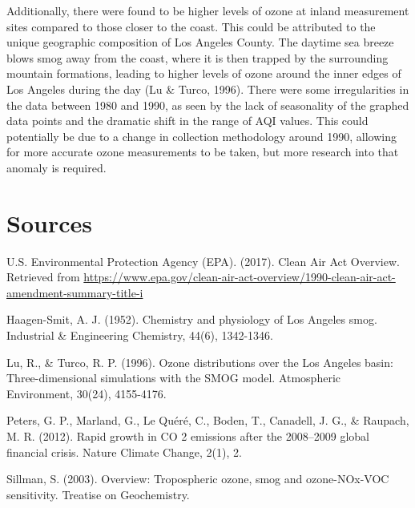 \documentclass[12pt,]{article}
\begin{document}
Additionally, there were found to be higher levels of ozone at inland
measurement sites compared to those closer to the coast. This could be
attributed to the unique geographic composition of Los Angeles County.
The daytime sea breeze blows smog away from the coast, where it is then
trapped by the surrounding mountain formations, leading to higher levels
of ozone around the inner edges of Los Angeles during the day (Lu \&
Turco, 1996). There were some irregularities in the data between 1980
and 1990, as seen by the lack of seasonality of the graphed data points
and the dramatic shift in the range of AQI values. This could
potentially be due to a change in collection methodology around 1990,
allowing for more accurate ozone measurements to be taken, but more
research into that anomaly is required.

\newpage

\section{Sources}\label{sources}

U.S. Environmental Protection Agency (EPA). (2017). Clean Air Act
Overview. Retrieved from
\url{https://www.epa.gov/clean-air-act-overview/1990-clean-air-act-amendment-summary-title-i}

Haagen-Smit, A. J. (1952). Chemistry and physiology of Los Angeles smog.
Industrial \& Engineering Chemistry, 44(6), 1342-1346.

Lu, R., \& Turco, R. P. (1996). Ozone distributions over the Los Angeles
basin: Three-dimensional simulations with the SMOG model. Atmospheric
Environment, 30(24), 4155-4176.

Peters, G. P., Marland, G., Le Quéré, C., Boden, T., Canadell, J. G., \&
Raupach, M. R. (2012). Rapid growth in CO 2 emissions after the
2008--2009 global financial crisis. Nature Climate Change, 2(1), 2.

Sillman, S. (2003). Overview: Tropospheric ozone, smog and ozone-NOx-VOC
sensitivity. Treatise on Geochemistry.
\end{document}
